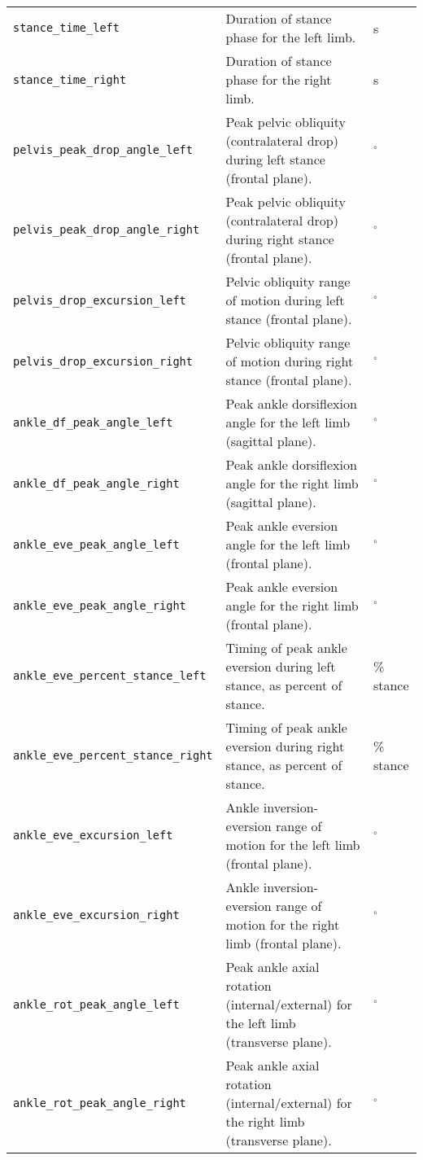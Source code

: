 {\begin{longtable}{@{}p{} p{} p{}@{}}
    \texttt{stance\_time\_left} & Duration of stance phase for the left limb. & s \\
    \texttt{stance\_time\_right} & Duration of stance phase for the right limb. & s \\
    \texttt{pelvis\_peak\_drop\_angle\_left} & Peak pelvic obliquity (contralateral drop) during left stance (frontal plane). & $^\circ$ \\
    \texttt{pelvis\_peak\_drop\_angle\_right} & Peak pelvic obliquity (contralateral drop) during right stance (frontal plane). & $^\circ$ \\
    \texttt{pelvis\_drop\_excursion\_left} & Pelvic obliquity range of motion during left stance (frontal plane). & $^\circ$ \\
    \texttt{pelvis\_drop\_excursion\_right} & Pelvic obliquity range of motion during right stance (frontal plane). & $^\circ$ \\
    \texttt{ankle\_df\_peak\_angle\_left} & Peak ankle dorsiflexion angle for the left limb (sagittal plane). & $^\circ$ \\
    \texttt{ankle\_df\_peak\_angle\_right} & Peak ankle dorsiflexion angle for the right limb (sagittal plane). & $^\circ$ \\
    \texttt{ankle\_eve\_peak\_angle\_left} & Peak ankle eversion angle for the left limb (frontal plane). & $^\circ$ \\
    \texttt{ankle\_eve\_peak\_angle\_right} & Peak ankle eversion angle for the right limb (frontal plane). & $^\circ$ \\
    \texttt{ankle\_eve\_percent\_stance\_left} & Timing of peak ankle eversion during left stance, as percent of stance. & \% stance \\
    \texttt{ankle\_eve\_percent\_stance\_right} & Timing of peak ankle eversion during right stance, as percent of stance. & \% stance \\
    \texttt{ankle\_eve\_excursion\_left} & Ankle inversion-eversion range of motion for the left limb (frontal plane). & $^\circ$ \\
    \texttt{ankle\_eve\_excursion\_right} & Ankle inversion-eversion range of motion for the right limb (frontal plane). & $^\circ$ \\
    \texttt{ankle\_rot\_peak\_angle\_left} & Peak ankle axial rotation (internal/external) for the left limb (transverse plane). & $^\circ$ \\
    \texttt{ankle\_rot\_peak\_angle\_right} & Peak ankle axial rotation (internal/external) for the right limb (transverse plane). & $^\circ$ \\

\end{longtable}}
